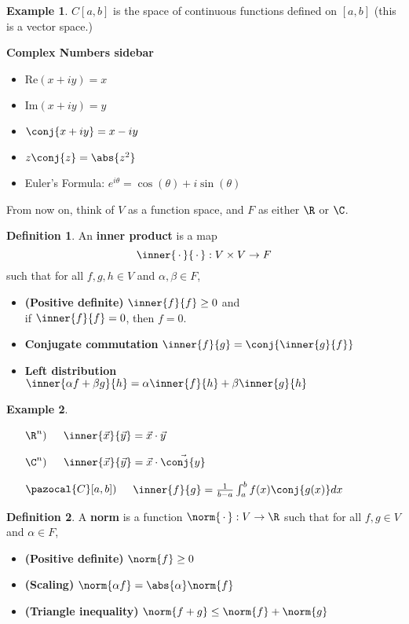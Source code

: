 \documentclass[a5paper]{article}
\newcommand{\real}[1]{\text{Re}(#1)}
\newcommand{\imaginary}[1]{\text{Im}(#1)}
\theoremstyle{definition}%
\newtheorem*{definition*}{Definition}
\newtheorem*{example*}{Example}
\numberwithin{exercise}{section}
\theoremstyle{remark}%
\begin{document}
\begin{example*}
$C[a,b]$ is the space of continuous functions defined on $[a,b]$ (this is a vector space.)
\end{example*}

\textbf{Complex Numbers sidebar}
\begin{itemize}
\item $\real{x+iy}=x$
\item $\imaginary{x+iy}=y$
\item $\conj{x+iy}=x-iy$
\item $z\conj{z}=\abs{z^2}$
\item Euler's Formula: $e^{i\theta}=\cos(\theta)+i\sin(\theta)$
\end{itemize}

From now on, think of $V$ as a function space, and $F$ as either $\R$ or $\C$. 

\begin{highlight}
\begin{definition*}
An \textbf{inner product} is a map 
$$\inner{\,\cdot\,}{\,\cdot\,}:V\times V\to F$$
such that for all $f,g,h\in V$ and $\alpha, \beta\in F$, 
\begin{itemize}
\item \textbf{(Positive definite)} $\inner{f}{f}\geq0$ and \\
		if $\inner{f}{f}=0$, then $f=0$. 
\item \textbf{Conjugate commutation} $\inner{f}{g}=\conj{\inner{g}{f}}$ 
\item \textbf{Left distribution} $\inner{\alpha f+\beta g}{h}=\alpha\inner{f}{h}+\beta\inner{g}{h}$
\end{itemize}
\end{definition*}
\end{highlight}

\begin{example*}\mbox{}
\begin{enumerate}
\item[$\R^n)$] $\quad \inner{\vec{x}}{\vec{y}}=\vec{x}\cdot \vec{y}$
\item[$\C^n)$] $\quad \inner{\vec{x}}{\vec{y}}=\vec{x}\cdot \vec{\conj{y}}$
\item[$\pazocal{C}\text{[}a,b\text{]})$] $\quad \inner{f}{g}=\frac{1}{b-a} \int_a^b f(x)\conj{g(x)}dx$
\end{enumerate}
\end{example*}

\begin{highlight}
\begin{definition*}
A \textbf{norm} is a function $\norm{\,\cdot\,}:V\to\R$ such that for all $f,g\in V$ and $\alpha\in F$, 
\begin{itemize}
\item \textbf{(Positive definite)} $\norm{f}\geq0$
\item \textbf{(Scaling)} $\norm{\alpha f}=\abs{\alpha}\norm{f}$
\item \textbf{(Triangle inequality)} $\norm{f+g}\leq\norm{f}+\norm{g}$
\end{itemize}
\end{definition*}
\end{highlight}
\end{document}
